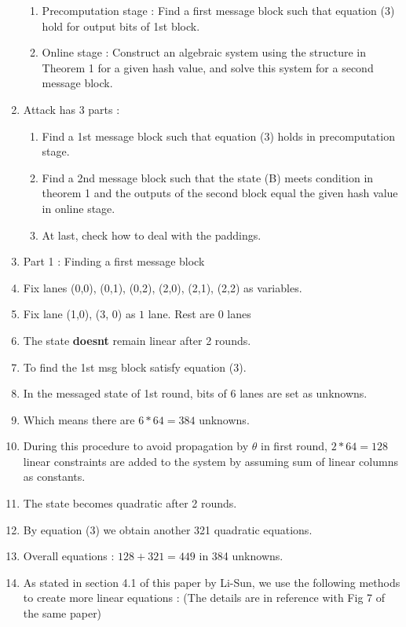 \documentclass{article}
\begin{document}
\begin{enumerate}
\begin{enumerate}
        \item Precomputation stage : Find a first message block such that equation (3) hold for output bits of 1st block.
        \item Online stage : Construct an algebraic system using the structure in Theorem 1 for a given hash value, and solve this system for a second message block.
    \end{enumerate}
    \item Attack has 3 parts : 
    \begin{enumerate}
        \item Find a 1st message block such that equation (3) holds in precomputation stage.
        \item Find a 2nd message block such that the state (B) meets condition in theorem 1 and the outputs of the second block equal the given hash value in online stage.
        \item At last, check how to deal with the paddings.
    \end{enumerate}
    \item Part 1 : Finding a first message block
    \item Fix lanes (0,0), (0,1), (0,2), (2,0), (2,1), (2,2) as variables.
    \item Fix lane (1,0), (3, 0) as $1$ lane. Rest are $0$ lanes
    \item The state \textbf{doesnt} remain linear after 2 rounds.
    \item To find the 1st msg block satisfy equation (3).
    \item In the messaged state of 1st round, bits of 6 lanes are set as unknowns.
    \item Which means there are $6*64 = 384$ unknowns.
    \item During this procedure to avoid propagation by $\theta$ in first round, $2*64 = 128$ linear constraints are added to the system by assuming sum of linear columns as constants.
    \item The state becomes quadratic after 2 rounds.
    \item By equation (3) we obtain another 321 quadratic equations.
    \item Overall equations : $128 + 321 = 449$ in 384 unknowns.
    \item As stated in section 4.1 of this paper by Li-Sun, we use the following methods to create more linear equations : (The details are in reference with Fig 7 of the same paper)
    \begin{enumerate}

\end{enumerate}
\end{enumerate}
\end{document}
